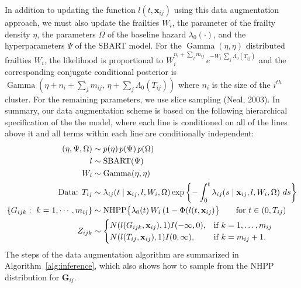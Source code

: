 \documentclass[11pt]{article}
\newcommand{\Gam}{\operatorname{Gamma}}
\begin{document}
In addition to updating the function $l(t,\mathbf x_{ij})$ using this data augmentation approach, we must also update the frailties $W_i$, the parameter of the frailty density $\eta$, the parameters $\Omega$ of the baseline hazard $\lambda_0(\cdot)$, and the hyperparameters  $\Psi$ of the SBART model. For  the $\Gam(\eta, \eta)$ distributed frailties $W_i$, the likelihood is proportional to
\begin{math}
    W_i^{n_i + \sum_j m_{ij}} \, e^{-W_i \, \sum_j \Lambda_0(T_{ij})}
\end{math}
and the corresponding conjugate conditional posterior is  $\Gam(\eta + n_i + \sum_j m_{ij}, \, \eta + \sum_j \Lambda_0(T_{ij}))$ where $n_i$ is the size of the $i^{th}$ cluster. For the remaining parameters, we use slice sampling (Neal, 2003). 
In summary, our data augmentation scheme is based on the following hierarchical specification of the the model, where each line is conditioned on all of the lines above it and all terms within each line are conditionally independent: 
\begin{align*}
    (\eta, \Psi, \Omega) &\sim p(\eta) \, p(\Psi) \, p(\Omega) \\
    l &\sim \operatorname{SBART}(\Psi) \\
    W_i &\sim \Gam(\eta, \eta) \\
    \text{Data: } T_{ij} &\sim 
      \lambda_{ij}(t \mid \mathbf x_{ij}, l, W_i, \Omega)
      \exp\left\{-\int_0^t \lambda_{ij}(s \mid \mathbf x_{ij}, l, W_i, \Omega) \ ds\right\} \\
    \{G_{ijk}:\ k=1,\cdots,m_{ij}\} &\sim 
      \textnormal{NHPP}\big\{\lambda_0(t) \, W_i \, (1-\Phi(l(t, \mathbf x_{ij})\big\} \qquad \textnormal{for $t \in (0,T_{ij})$} \\
    Z_{ijk} &\sim 
    \begin{cases}
      N(l(G_{ijk}, \mathbf{x}_{ij}),1)I(-\infty,0), & \text{if}\ k=1,\dots, m_{ij} \\
      N(l(T_{ij}, \mathbf{x}_{ij}),1)I(0,\infty), & \text{if}\ k=m_{ij}+1.
    \end{cases}
\end{align*}
The steps of the data augmentation algorithm are summarized in Algorithm~\ref{alg:inference}, which also shows how to sample from the NHPP distribution for $\mathbf G_{ij}$.
\end{document}
